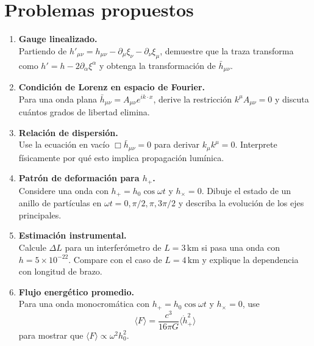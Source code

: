 \section*{Problemas propuestos}

\begin{enumerate}[leftmargin=2.2em, label=\textbf{P\arabic*.}]

\item \textbf{Gauge linealizado.} \\
Partiendo de $h'_{\mu\nu}=h_{\mu\nu}-\partial_\mu\xi_\nu-\partial_\nu\xi_\mu$, demuestre que la traza transforma como $h' = h - 2\partial_\alpha\xi^\alpha$ y obtenga la transformación de $\bar h_{\mu\nu}$.

\item \textbf{Condición de Lorenz en espacio de Fourier.} \\
Para una onda plana $\bar h_{\mu\nu}=A_{\mu\nu}e^{ik\cdot x}$, derive la restricción $k^\mu A_{\mu\nu}=0$ y discuta cuántos grados de libertad elimina.

\item \textbf{Relación de dispersión.} \\
Use la ecuación en vacío $\Box\bar h_{\mu\nu}=0$ para derivar $k_\mu k^\mu=0$. Interprete físicamente por qué esto implica propagación lumínica.

\item \textbf{Patrón de deformación para $h_+$.} \\
Considere una onda con $h_+=h_0\cos\omega t$ y $h_\times=0$. Dibuje el estado de un anillo de partículas en $\omega t=0,\pi/2,\pi,3\pi/2$ y describa la evolución de los ejes principales.

\item \textbf{Estimación instrumental.} \\
Calcule $\Delta L$ para un interferómetro de $L=3\,\mathrm{km}$ si pasa una onda con $h=5\times10^{-22}$. Compare con el caso de $L=4\,\mathrm{km}$ y explique la dependencia con longitud de brazo.

\item \textbf{Flujo energético promedio.} \\
Para una onda monocromática con $h_+=h_0\cos\omega t$ y $h_\times=0$, use
\begin{equation*}
\langle F\rangle=\frac{c^3}{16\pi G}\langle\dot h_+^2\rangle
\end{equation*}
para mostrar que $\langle F\rangle\propto \omega^2 h_0^2$.

\end{enumerate}
